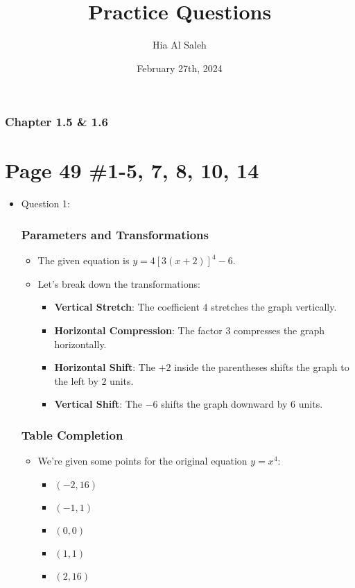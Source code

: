 \documentclass{article}
\title{Practice Questions}
\author{Hia Al Saleh}
\date{February 27th, 2024}
\begin{document}
\maketitle
\subsubsection*{Chapter 1.5 \& 1.6}
\section*{Page 49 \#1-5, 7, 8, 10, 14}
\begin{itemize}

\item Question 1:
\subsubsection*{Parameters and Transformations}
\begin{itemize}
    \item The given equation is \(y = 4[3(x + 2)]^4 - 6\).
    \item Let's break down the transformations:
    \begin{itemize}
        \item \textbf{Vertical Stretch}: The coefficient \(4\) stretches the graph vertically.
        \item \textbf{Horizontal Compression}: The factor \(3\) compresses the graph horizontally.
        \item \textbf{Horizontal Shift}: The \(+2\) inside the parentheses shifts the graph to the left by \(2\) units.
        \item \textbf{Vertical Shift}: The \(-6\) shifts the graph downward by \(6\) units.
    \end{itemize}
\end{itemize}

\subsubsection*{Table Completion}
\begin{itemize}
    \item We're given some points for the original equation \(y = x^4\):
    \begin{itemize}
        \item \((-2, 16)\)
        \item \((-1, 1)\)
        \item \((0, 0)\)
        \item \((1, 1)\)
        \item \((2, 16)\)
    \end{itemize}
\end{itemize}


\end{itemize}
\end{document}
